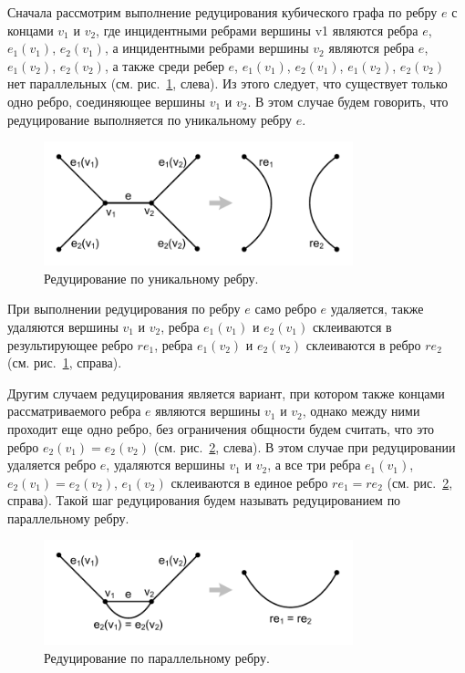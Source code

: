 Сначала рассмотрим выполнение редуцирования кубического графа по ребру $e$ с концами $v_1$ и $v_2$, где инцидентными ребрами вершины v1 являются ребра $e$, $e_1(v_1)$, $e_2(v_1)$, а инцидентными ребрами вершины $v_2$ являются ребра $e$, $e_1(v_2)$, $e_2(v_2)$, а также среди ребер $e$, $e_1(v_1)$, $e_2(v_1)$, $e_1(v_2)$, $e_2(v_2)$ нет параллельных (см. рис.~\ref{fig:text_3_edge_coloring_1}, слева).
Из этого следует, что существует только одно ребро, соединяющее вершины $v_1$ и $v_2$.
В этом случае будем говорить, что редуцирование выполняется по уникальному ребру $e$.

\begin{figure}[ht]
\centering
\includegraphics[width=0.8\textwidth]{fig/par_edge_col_1-pic-reduce-edge-type-1.pdf}
\singlespacing
{}\caption{Редуцирование по уникальному ребру.}
\label{fig:text_3_edge_coloring_1}
\end{figure}

При выполнении редуцирования по ребру $e$ само ребро $e$ удаляется, также удаляются вершины $v_1$ и $v_2$, ребра $e_1(v_1)$ и $e_2(v_1)$ склеиваются в результирующее ребро $re_1$, ребра $e_1(v_2)$ и $e_2(v_2)$ склеиваются в ребро $re_2$ (см. рис.~\ref{fig:text_3_edge_coloring_1}, справа).

Другим случаем редуцирования является вариант, при котором также концами рассматриваемого ребра $e$ являются вершины $v_1$ и $v_2$, однако между ними проходит еще одно ребро, без ограничения общности будем считать, что это ребро $e_2(v_1) = e_2(v_2)$ (см. рис.~\ref{fig:text_3_edge_coloring_2}, слева).
В этом случае при редуцировании удаляется ребро $e$, удаляются вершины $v_1$ и $v_2$, а все три ребра $e_1(v_1)$, $e_2(v_1) = e_2(v_2)$, $e_1(v_2)$ склеиваются в единое ребро $re_1 = re_2$ (см. рис.~\ref{fig:text_3_edge_coloring_2}, справа).
Такой шаг редуцирования будем называть редуцированием по параллельному ребру.

\begin{figure}[ht]
\centering
\includegraphics[width=0.8\textwidth]{fig/par_edge_col_2-pic-reduce-edge-type-2.pdf}
\singlespacing
{}\caption{Редуцирование по параллельному ребру.}
\label{fig:text_3_edge_coloring_2}
\end{figure}


